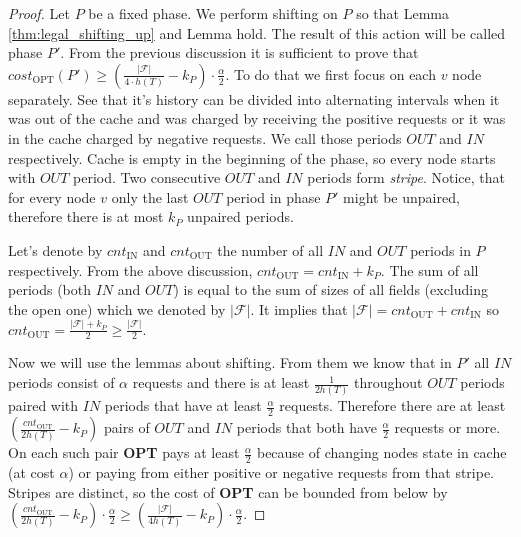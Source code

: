 \begin{proof}
Let $P$ be a fixed phase. We perform shifting on $P$ so that Lemma 
\ref{thm:legal_shifting_up} and Lemma \label{thm:legal_shifting_down} hold. The 
result of this action will be called phase $P'$. From the previous discussion 
it is sufficient to prove that $cost_{\mathrm{OPT}}(P') \geq 
(\frac{|\mathcal{F}|}{4 
\cdot h(T)}-k_P) \cdot \frac{\alpha}{2}$. To do that we first focus on each $v$ 
node separately. See that it's history can be divided into alternating 
intervals when it was out of the cache and was charged by receiving the positive 
requests or it was in the cache charged by negative requests. We call those 
periods $OUT$ and $IN$ respectively. Cache is empty in the beginning of the 
phase, so every node starts with $OUT$ period. Two consecutive $OUT$ and $IN$ 
periods form \textit{stripe}. Notice, that for every node $v$ only the last 
$OUT$ period in phase $P'$ might be unpaired, therefore there is at most $k_P$ 
unpaired periods.

Let's denote by $cnt_{\mathrm{IN}}$ and $cnt_{\mathrm{OUT}}$ the number of all 
$IN$ and $OUT$ 
periods in $P$ respectively. From the above discussion, $cnt_{\mathrm{OUT}} = 
cnt_{\mathrm{IN}} + 
k_P$. The sum of all periods (both $IN$ and $OUT$) is equal to the sum of sizes 
of all fields (excluding the open one) which we denoted by $|\mathcal{F}|$. It 
implies that $|\mathcal{F}| = cnt_{\mathrm{OUT}} + cnt_{\mathrm{IN}}$ so 
$cnt_{\mathrm{OUT}} = 
\frac{|\mathcal{F}| + k_P}{2} \geq \frac{|\mathcal{F}|}{2}.$

Now we will use the lemmas about shifting. From them we know that in $P'$ all 
$IN$ periods consist of $\alpha$ requests and there is at least 
$\frac{1}{2h(T)}$ throughout $OUT$ periods paired with $IN$ periods that have 
at least $\frac{\alpha}{2}$ requests. Therefore there are at least 
$(\frac{cnt_{\mathrm{OUT}}}{2h(T)} - k_P)$ pairs of $OUT$ and $IN$ periods that 
both 
have $\frac{\alpha}{2}$ requests or more. On each such pair \textbf{OPT} pays 
at least $\frac{\alpha}{2}$ because of changing nodes state in cache (at cost 
$\alpha$) or paying from either positive or negative requests from that stripe. 
Stripes are distinct, so the cost of \textbf{OPT} can be bounded from below by 
$(\frac{cnt_{\mathrm{OUT}}}{2h(T)} - k_P) \cdot \frac{\alpha}{2} \geq 
(\frac{|\mathcal{F}|}{4h(T)} - k_P) \cdot  \frac{\alpha}{2}$.
\end{proof}

